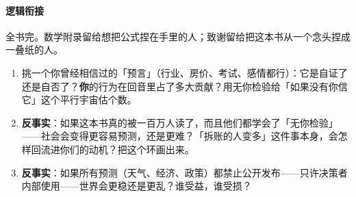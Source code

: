 \documentclass[../../main2.tex]{subfiles}
\begin{document}
\paragraph*{逻辑衔接}
	全书完。数学附录留给想把公式捏在手里的人；致谢留给把这本书从一个念头捏成一叠纸的人。

\begin{thinkbox}
\begin{enumerate}
	\item 挑一个你曾经相信过的「预言」（行业、房价、考试、感情都行）：它是自证了还是自否了？\textbf{你}的行为在回音里占了多大贡献？用无你检验给「如果没有你信它」这个平行宇宙估个数。
	\item \textbf{反事实}：如果这本书真的被一百万人读了，而且他们都学会了「无你检验」——社会会变得更容易预测，还是更难？「拆账的人变多」这件事本身，会怎样回流进你们的动机？把这个环画出来。
	\item \textbf{反事实}：如果所有预测（天气、经济、政策）都禁止公开发布——只许决策者内部使用——世界会更稳还是更乱？谁受益，谁受损？
\end{enumerate}
\end{thinkbox}
\end{document}
